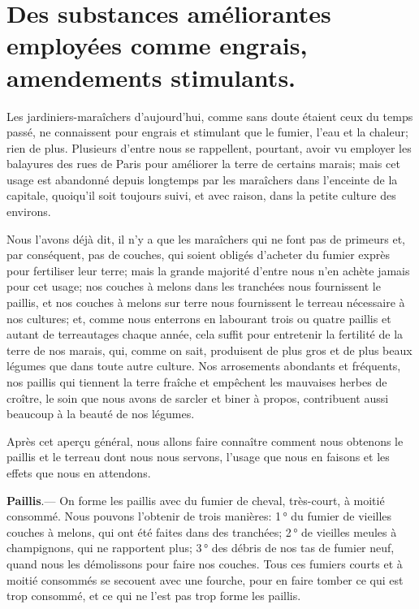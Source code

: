 \documentclass[10pt,a4paper]{book}
\begin{document}
\chapter{Des substances améliorantes employées comme engrais, amendements stimulants.}

Les jardiniers-maraîchers d'aujourd'hui, comme sans doute étaient ceux du temps passé, ne connaissent pour engrais et stimulant que le fumier, l'eau et la chaleur; rien de plus. Plusieurs d'entre nous se rappellent, pourtant, avoir vu employer les balayures des rues de Paris pour améliorer la terre de certains marais; mais cet usage est abandonné depuis longtemps par les maraîchers dans l'enceinte de la capitale, quoiqu'il soit toujours suivi, et avec raison, dans la petite culture des environs.

Nous l'avons déjà dit, il n'y a que les maraîchers qui ne font pas de primeurs et, par conséquent, pas de couches, qui soient obligés d'acheter du fumier exprès pour fertiliser leur terre; mais la grande majorité d'entre nous n'en achète jamais pour cet usage; nos couches à melons dans les tranchées nous fournissent le paillis, et nos couches à melons sur terre nous fournissent le terreau nécessaire à nos cultures; et, comme nous enterrons en labourant trois ou quatre paillis et autant de terreautages chaque année, cela suffit pour entretenir la fertilité de la terre de nos marais, qui, comme on sait, produisent de plus gros et de plus beaux légumes que dans toute autre culture. Nos arrosements abondants et fréquents, nos paillis qui tiennent la terre fraîche et empêchent les mauvaises herbes de croître, le soin que nous avons de sarcler et biner à propos, contribuent aussi beaucoup à la beauté de nos légumes.

Après cet aperçu général, nous allons faire connaître comment nous obtenons le paillis et le terreau dont nous nous servons, l'usage que nous en faisons et les effets que nous en attendons.

\textbf{Paillis}.--- On forme les paillis avec du fumier de cheval, très-court, à moitié consommé. Nous pouvons l'obtenir de trois manières: 1\,° du fumier de vieilles couches à melons, qui ont été faites dans des tranchées; 2\,° de vieilles meules à champignons, qui ne rapportent plus; 3\,° des débris de nos tas de fumier neuf, quand nous les démolissons pour faire nos couches. Tous ces fumiers courts et à moitié consommés se secouent avec une fourche, pour en faire tomber ce qui est trop consommé, et ce qui ne l'est pas trop forme les paillis.
\end{document}
